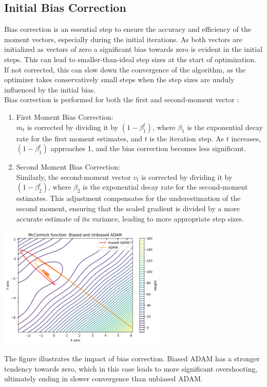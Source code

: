 \documentclass[oneside]{article}
\begin{document}
\subsection{Initial Bias Correction}
Bias correction is an essential step to ensure the accuracy and efficiency of the moment vectors, especially during the initial iterations. As both vectors are initialized as vectors of zero a significant bias towards zero is evident in the initial steps. This can lead to smaller-than-ideal step sizes at the start of optimization. If not corrected, this can slow down the convergence of the algorithm, as the optimizer takes conservatively small steps when the step sizes are unduly influenced by the initial bias.\\
Bias correction is performed for both the first and second-moment vector :
\begin{enumerate}
    \item First Moment Bias Correction:\\
    \(m_t\) is corrected by dividing it by \((1 - \beta_1^t)\), where \(\beta_1\) is the exponential decay rate for the first moment estimates, and \(t\) is the iteration step. As \(t\) increases, \((1 - \beta_1^t)\) approaches 1, and the bias correction becomes less significant.
    \item Second Moment Bias Correction:\\
    Similarly, the second-moment vector \(v_t\) is corrected by dividing it by \((1 - \beta_2^t)\), where \(\beta_2\) is the exponential decay rate for the second-moment estimates. This adjustment compensates for the underestimation of the second moment, ensuring that the scaled gradient is divided by a more accurate estimate of its variance, leading to more appropriate step sizes.
\end{enumerate}
\begin{center}
    \includegraphics[width=0.6\textwidth]{report/figures/ADAM_bias.png}\\
\end{center}
The figure illustrates the impact of bias correction. Biased ADAM has a stronger tendency towards zero, which in this case leads to more significant overshooting, ultimately ending in slower convergence than unbiased ADAM.
\end{document}

